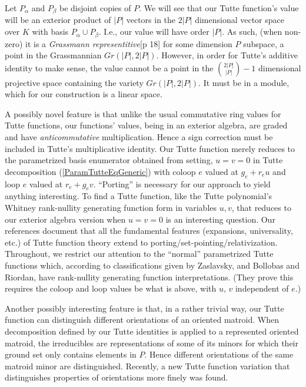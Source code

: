 \documentclass[Unicode]{cedram-alco}
\begin{document}
Let $P_{\alpha}$ and $P_{\beta}$ be disjoint copies of $P$. 
We will see that our Tutte function's value will be an exterior product of
$|P|$ vectors in the $2|P|$ dimensional vector space over $K$ with
basis $P_\alpha \cup P_\beta$.
I.e., our value will
have order  $|P|$.
As such, (when non-zero)
it is a \emph{Grassmann representitive}\cite{MarcusFDMuAlPt2}[p 18]
for some
dimension $P$ subspace, a point in the Grassmannian $Gr(|P|,2|P|)$.
However, in order for Tutte's additive identity to make sense, the value cannot be
a point in the $\binom{2|P|}{|P|}-1$ dimensional projective space
containing the variety $Gr(|P|,2|P|)$.  It must be in a module, which for
our construction is a linear space.

A possibly novel feature is that unlike the usual commutative ring values for Tutte
functions, our functions' values, being in an exterior algebra, are graded and have
\emph{anticommutative} multiplication.
Hence a sign correction must be included in Tutte's multiplicative
identity.  Our Tutte function merely reduces to the parametrized
basis enumerator obtained from setting, $u=v=0$ in Tutte
decomposition (\ref{ParamTutteEqGeneric})
with coloop $e$ valued at $g_e+r_eu$ and loop $e$ valued at $r_e+g_ev$.
``Porting'' is necessary for our approach to yield anything
interesting. To find a Tutte function,
like the Tutte polynomial's Whitney rank-nullity
generating function form in variables $u,v$, that reduces to our exterior
algebra version when $u=v=0$ is an interesting question.
Our
references\cite{MR0419272,SetPointedLV,sdcPorted,TutteEx,RelTuttePolyDiaoHetyei}
document that all the fundamental features
(expansions, universality, etc.)
of Tutte function theory extend to porting/set-pointing/relativization.  Throughout,
we restrict our attention to the ``normal'' parametrized Tutte functions which, according
to classifications given by Zaslavsky\cite{MR93a:05047},
and Bollobas and Riordan\cite{BollobasRiordanTuttePolyColored},
have rank-nullity generating function interpretations.
(They prove this requires the
coloop and loop values be what is above, with $u$, $v$ independent of $e$.)

Another possibly interesting feature is that, in a rather trivial way,
our Tutte function can distinguish different orientations of an oriented
matroid.  When decomposition defined by our Tutte identities is applied to
a represented oriented matroid, the irreducibles are representations of
some of its minors for which their ground set only contains elements in $P$.
Hence different orientations of the same matroid minor are distinguished.  Recently,
a new Tutte function variation that distinguishes properties of orientations
more finely was found\cite{AwanBernardiOMTuttePre}.
\end{document}
